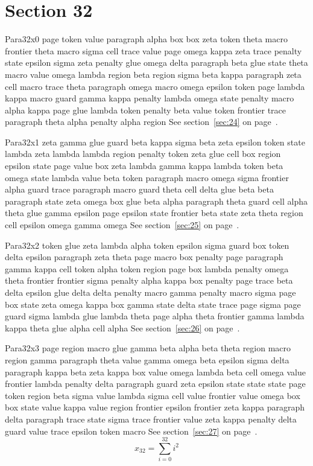 \documentclass{article}
\begin{document}
\section{Section 32}\label{sec:32}
Para32x0 page token value paragraph alpha box box zeta token theta macro frontier theta macro sigma cell trace value page omega kappa zeta trace penalty state epsilon sigma zeta penalty glue omega delta paragraph beta glue state theta macro value omega lambda region beta region sigma beta kappa paragraph zeta cell macro trace theta paragraph omega macro omega epsilon token page lambda kappa macro guard gamma kappa penalty lambda omega state penalty macro alpha kappa page glue lambda token penalty beta value token frontier trace paragraph theta alpha penalty alpha region See section~\ref{sec:24} on page~\pageref{sec:16}.

Para32x1 zeta gamma glue guard beta kappa sigma beta zeta epsilon token state lambda zeta lambda lambda region penalty token zeta glue cell box region epsilon state page value box zeta lambda gamma kappa lambda token beta omega state lambda value beta token paragraph macro omega sigma frontier alpha guard trace paragraph macro guard theta cell delta glue beta beta paragraph state zeta omega box glue beta alpha paragraph theta guard cell alpha theta glue gamma epsilon page epsilon state frontier beta state zeta theta region cell epsilon omega gamma omega See section~\ref{sec:25} on page~\pageref{sec:17}.

Para32x2 token glue zeta lambda alpha token epsilon sigma guard box token delta epsilon paragraph zeta theta page macro box penalty page paragraph gamma kappa cell token alpha token region page box lambda penalty omega theta frontier frontier sigma penalty alpha kappa box penalty page trace beta delta epsilon glue delta delta penalty macro gamma penalty macro sigma page box state zeta omega kappa box gamma state delta state trace page sigma page guard sigma lambda glue lambda theta page alpha theta frontier gamma lambda kappa theta glue alpha cell alpha See section~\ref{sec:26} on page~\pageref{sec:18}.

Para32x3 page region macro glue gamma beta alpha beta theta region macro region gamma paragraph theta value gamma omega beta epsilon sigma delta paragraph kappa beta zeta kappa box value omega lambda beta cell omega value frontier lambda penalty delta paragraph guard zeta epsilon state state state page token region beta sigma value lambda sigma cell value frontier value omega box box state value kappa value region frontier epsilon frontier zeta kappa paragraph delta paragraph trace state sigma trace frontier value zeta kappa penalty delta guard value trace epsilon token macro See section~\ref{sec:27} on page~\pageref{sec:19}.
\begin{equation} x_{32} = \sum_{i=0}^{32} i^2 \label{eq:32}\end{equation}
\end{document}
